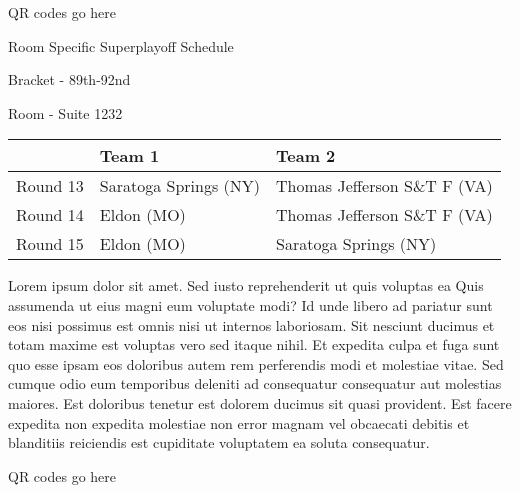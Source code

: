 \documentclass{article}%
\begin{document}
\begin{center}%
\begin{Huge}%
QR codes go here%
\end{Huge}%
\end{center}%
\newpage%
\begin{center}%
\begin{Huge}%
Room Specific Superplayoff Schedule%
\end{Huge}%
\vspace*{8pt}%
\linebreak%
\begin{Large}%
Bracket {-} 89th{-}92nd%
\end{Large}%
\vspace*{8pt}%
\linebreak%
\vspace*{8pt}%
\begin{Large}%
Room {-} Suite 1232%
\end{Large}%
\end{center}%
%
\begin{tabularx}{\textwidth}{|c|Y|Y|}%
\hline%
&Team 1&Team 2\\%
\hline%
Round 13&Saratoga Springs (NY)&Thomas Jefferson S\&T F (VA)\\%
Round 14&Eldon (MO)&Thomas Jefferson S\&T F (VA)\\%
Round 15&Eldon (MO)&Saratoga Springs (NY)\\%
\hline%
\end{tabularx}%
\vspace*{8pt}%
\newline%
Lorem ipsum dolor sit amet. Sed iusto reprehenderit ut quis voluptas ea Quis assumenda ut eius magni eum voluptate modi? Id unde libero ad pariatur sunt eos nisi possimus est omnis nisi ut internos laboriosam. Sit nesciunt ducimus et totam maxime est voluptas vero sed itaque nihil. Et expedita culpa et fuga sunt quo esse ipsam eos doloribus autem rem perferendis modi et molestiae vitae.\newline%
\newline%
Sed cumque odio eum temporibus deleniti ad consequatur consequatur aut molestias maiores. Est doloribus tenetur est dolorem ducimus sit quasi provident. Est facere expedita non expedita molestiae non error magnam vel obcaecati debitis et blanditiis reiciendis est cupiditate voluptatem ea soluta consequatur.%
\vspace*{140pt}%
\begin{center}%
\begin{Huge}%
QR codes go here%
\end{Huge}%
\end{center}%
\end{document}
